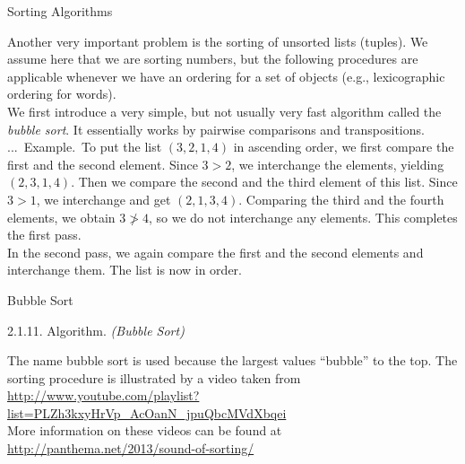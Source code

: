 \documentclass[smaller,hyperref={CJKbookmarks=true}]{beamer}
\newcounter{zhuo}[subsection]
\renewcommand{\thezhuo}{\thesection.\thesubsection.\arabic{zhuo}}
\newenvironment{EXAMPLE}{\stepcounter{zhuo}\alert{\!\thezhuo.~Example.\,}}{}
\begin{document}
\begin{frame}[t]{Sorting Algorithms}
\begin{spacing}{1.1}
Another very important problem is the sorting of unsorted lists (tuples).
We assume here that we are sorting numbers, but the following procedures
are applicable whenever we have an ordering for a set of objects (e.g.,
lexicographic ordering for words).\\[5pt]
We first introduce a very simple, but not usually very fast algorithm called
the \emph{bubble sort}. It essentially works by pairwise comparisons and
transpositions.\\[5pt]
\begin{EXAMPLE}
To put the list $(3,2,1,4)$ in ascending order, we first compare the first and the second element. Since $3>2$, we interchange the elements, yielding $(2,3,1,4)$. Then we compare the second and the third element of this list. Since $3>1$, we interchange and get $(2,1,3,4)$. Comparing the third and the fourth elements, we obtain $3\ngtr4$, so we do not interchange any elements. This completes the first pass.\\[4pt]
In the second pass, we again compare the first and the second elements
and interchange them. The list is now in order.
\end{EXAMPLE}
\end{spacing}
\end{frame}
\begin{frame}[t]{Bubble Sort}
\begin{spacing}{1.05}
\alert{2.1.11. Algorithm.} \emph{(Bubble Sort)}\\[3pt]
\IncMargin{1em}
\begin{algorithm}[H]
\end{algorithm}\DecMargin{1em}
\vspace*{4pt}
The name bubble sort is used because the largest values ``bubble'' to the
top. The sorting procedure is illustrated by a video taken from\\[3pt]
{\small\url{http://www.youtube.com/playlist?list=PLZh3kxyHrVp_AcOanN_jpuQbcMVdXbqei}}\\
More information on these videos can be found at\\[4pt]
\url{http://panthema.net/2013/sound-of-sorting/}
\end{spacing}
\end{frame}
\end{document}
